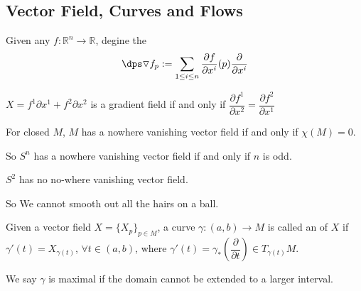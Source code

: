 \subsection{Vector Field, Curves and Flows}
Given any  $ f:\mathbb{R}^n\rightarrow \mathbb{R} $, degine the  
\[\dps\triangledown f_p:=\sum\limits_{1 \leq i \leq n}\frac{\partial f}{\partial x^i}(p)\frac{\partial}{\partial x^i}\] 
\begin{example}
    $ X=f^1\partial x^1+f^2\partial x^2 $ is a gradient field if and only if  $ \dfrac{\partial f^1}{\partial x^2}=\dfrac{\partial f^2}{\partial x^1} $ 
\end{example}
\begin{theorem}
   For closed  $ M  $,  $ M  $ has a nowhere vanishing vector field if and only if  $ \chi(M)=0 $. 
\end{theorem}
So  $ S^n $ has a  nowhere vanishing vector field if and only if  $ n  $ is odd.
\begin{theorem}[MaoQiu]
    $ S^2 $ has no no-where vanishing vector field.
    
   
\end{theorem}
So We cannot smooth out all the hairs on a ball.

   Given  a vector field  $ X=\{X_p\}_{p\in M} $, a curve  $ \gamma:(a,b)\rightarrow M $ is called an  of  $ X $ if  $ \gamma'(t)=X_{\gamma(t)} $, $ \forall t\in (a,b) $, 
   where  $ \gamma'(t)=\gamma_*(\dfrac{\partial }{\partial t})\in T_{\gamma(t)}M $.
   
   We say  $ \gamma  $ is maximal if the domain cannot be extended to a larger interval.     